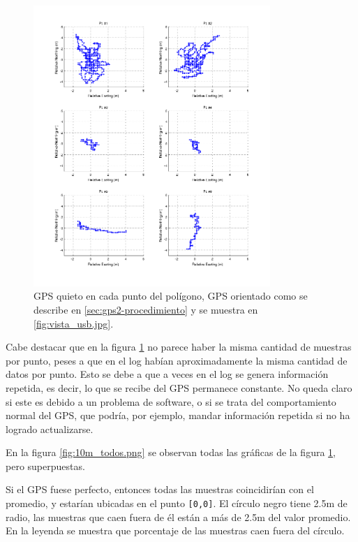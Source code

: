 \documentclass[spanish,12pt,a4paper,titlepage]{report}
\begin{document}
\begin{figure}[h!]
  \includegraphics[width=0.8\textwidth]{./img/10min_grid.png}
  \caption{GPS quieto en cada punto del polígono, GPS orientado como se describe en \ref{sec:gps2-procedimiento} y se muestra en \ref{fig:vista_usb.jpg}.}
  \label{fig:10min_grid.png}
\end{figure}

Cabe destacar que en la figura \ref{fig:10min_grid.png} no parece haber la misma cantidad de muestras por punto, peses a que en el log habían aproximadamente la misma cantidad de datos por punto. Esto se debe a que a veces en el log se genera información repetida, es decir, lo que se recibe del GPS permanece constante. No queda claro si este es debido a un problema de software, o si se trata del comportamiento normal del GPS, que podría, por ejemplo, mandar información repetida si no ha logrado actualizarse.

\newpage
En la figura \ref{fig:10m_todos.png} se observan todas las gráficas de la figura \ref{fig:10min_grid.png}, pero superpuestas.

Si el GPS fuese perfecto, entonces todas las muestras coincidirían con el promedio, y estarían ubicadas en el punto \verb+[0,0]+. El círculo negro tiene 2.5m de radio, las muestras que caen fuera de él están a más de 2.5m del valor promedio. En la leyenda se muestra que porcentaje de las muestras caen fuera del círculo.
\end{document}
